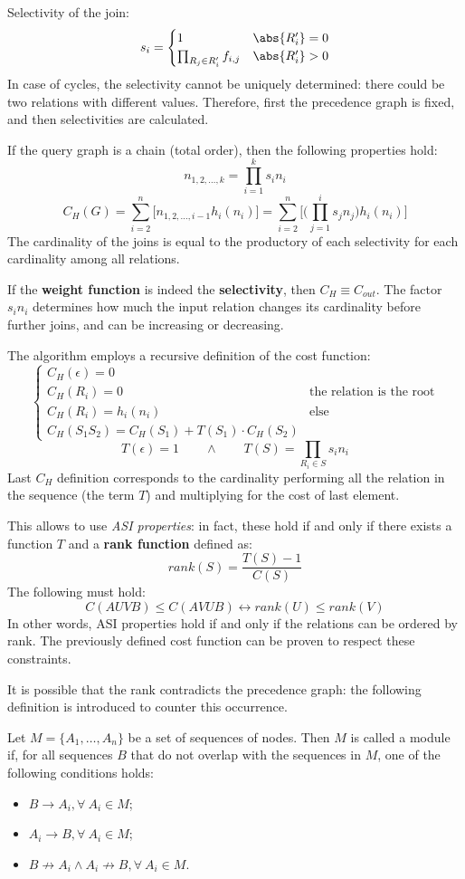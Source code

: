 Selectivity of the join:
$$s_i = \begin{cases}
1 & \abs{R_i'} = 0 \\
\prod_{R_j \in R'_i} f_{i, j} & \abs{R'_i} > 0
\end{cases}$$
In case of cycles, the selectivity cannot be uniquely determined: there could be two relations with different values. Therefore, first the precedence graph is fixed, and then selectivities are calculated.

If the query graph is a chain (total order), then the following properties hold:
$$n_{1, 2, \dots, k} = \prod_{i=1}^{k}s_in_i$$
$$C_H(G) = \sum_{i=2}^{n}\big[n_{1, 2, \dots, i-1}h_i(n_i)\big] = \sum_{i=2}^{n}\Big[\Big(\prod_{j=1}^{i}s_jn_j\Big)h_i(n_i)\Big]$$
The cardinality of the joins is equal to the productory of each selectivity for each cardinality among all relations.

If the \textbf{weight function} is indeed the \textbf{selectivity}, then $C_H \equiv C_{out}$. The factor $s_in_i$ determines how much the input relation changes its cardinality before further joins, and can be increasing or decreasing.

The algorithm employs a recursive definition of the cost function:
$$\begin{cases}
C_H(\epsilon) = 0 \\
C_H(R_i) = 0 & \text{the relation is the root} \\
C_H(R_i) = h_i(n_i) & \text{else} \\
C_H(S_1S_2) = C_H(S_1) + T(S_1) \cdot C_H(S_2)
\end{cases}$$
$$T(\epsilon) = 1 \qquad \land \qquad T(S) = \prod_{R_i \in S}s_in_i$$
Last $C_H$ definition corresponds to the cardinality performing all the relation in the sequence (the term $T$) and multiplying for the cost of last element.

This allows to use \textit{ASI properties}: in fact, these hold if and only if there exists a function $T$ and a \textbf{rank function} defined as:
$$rank(S) = \frac{T(S) - 1}{C(S)}$$
The following must hold:
$$C(AUVB) \leq C(AVUB) \leftrightarrow rank(U) \leq rank(V)$$
In other words, ASI properties hold if and only if the relations can be ordered by rank. The previously defined cost function can be proven to respect these constraints.

It is possible that the rank contradicts the precedence graph: the following definition is introduced to counter this occurrence.

Let $M = \{A_1, \dots, A_n\}$ be a set of sequences of nodes. Then $M$ is called a module if, for all sequences $B$ that do not overlap with the sequences in $M$, one of the following conditions holds:
\begin{itemize}
	\item $B \rightarrow A_i, \forall\ A_i \in M$;
	\item $A_i \rightarrow B, \forall\ A_i \in M$;
	\item $B \nrightarrow A_i \land A_i \nrightarrow B, \forall\ A_i \in M$.
\end{itemize}


